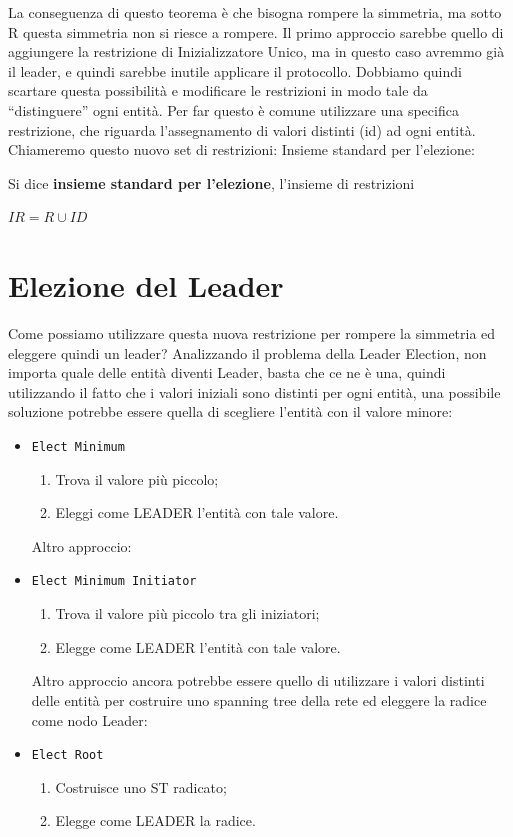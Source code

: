 La conseguenza di questo teorema è che bisogna rompere la simmetria, ma sotto
R questa simmetria non si riesce a rompere. Il primo approccio sarebbe quello di
aggiungere la restrizione di Inizializzatore Unico, ma in questo caso avremmo
già il leader, e quindi sarebbe inutile applicare il protocollo. Dobbiamo quindi
scartare questa possibilità e modificare le restrizioni in modo tale da
``distinguere'' ogni entità. Per far questo è comune utilizzare una specifica
restrizione, che riguarda l'assegnamento di valori distinti (id) ad ogni entità.
Chiameremo questo nuovo set di restrizioni: Insieme standard per l'elezione:

\begin{definition}
    Si dice \textbf{insieme standard per l'elezione}, l'insieme di
    restrizioni
    \begin{center}
        $IR = R \cup {ID}$
    \end{center}
\end{definition}

\section{Elezione del Leader}
Come possiamo utilizzare questa nuova restrizione per rompere la simmetria ed
eleggere quindi un leader? Analizzando il problema della Leader Election, non
importa quale delle entità diventi Leader, basta che ce ne è una, quindi
utilizzando il fatto che i valori iniziali sono distinti per ogni entità, una
possibile soluzione potrebbe essere quella di scegliere l'entità con il valore
minore:
\begin{itemize}
    \item \texttt{Elect Minimum}
          \begin{enumerate}
              \item Trova il valore più piccolo;
              \item Eleggi come LEADER l'entità con tale valore.
          \end{enumerate}
          Altro approccio:
    \item \texttt{Elect Minimum Initiator}
          \begin{enumerate}
              \item Trova il valore più piccolo tra gli iniziatori;
              \item Elegge come LEADER l'entità con tale valore.
          \end{enumerate}
          Altro approccio ancora potrebbe essere quello di utilizzare i valori
          distinti delle entità per costruire uno spanning tree della rete ed
          eleggere la radice come nodo Leader:
    \item \texttt{Elect Root}
          \begin{enumerate}
              \item Costruisce uno ST radicato;
              \item Elegge come LEADER la radice.
          \end{enumerate}
\end{itemize}

